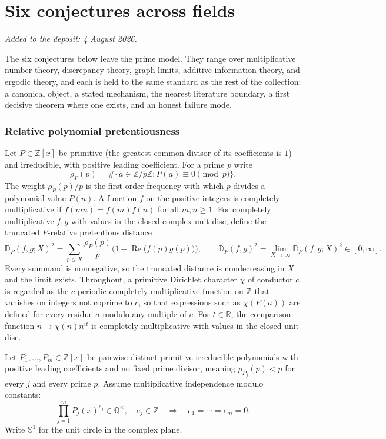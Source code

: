 \documentclass[11pt]{article}
\theoremstyle{definition}
\newcommand{\Z}{\mathbb Z}
\newcommand{\Q}{\mathbb Q}
\newcommand{\R}{\mathbb R}
\providecommand{\Z}{\mathbb Z}
\providecommand{\Q}{\mathbb Q}
\providecommand{\R}{\mathbb R}
\begin{document}
\part{Six conjectures across fields}

\medskip\noindent\emph{Added to the deposit: 4 August 2026.}\par\medskip

The six conjectures below leave the prime model.  They range over multiplicative number theory, discrepancy theory, graph limits, additive information theory, and ergodic theory, and each is held to the same standard as the rest of the collection: a canonical object, a stated mechanism, the nearest literature boundary, a first decisive theorem where one exists, and an honest failure mode.

\section{Relative polynomial pretentiousness}

Let $P\in\Z[x]$ be primitive (the greatest common divisor of its
coefficients is $1$) and irreducible, with positive leading
coefficient.  For a prime $p$ write
\[
\rho_P(p)=\#\{a\in\Z/p\Z:P(a)\equiv0\pmod p\}.
\]
The weight $\rho_P(p)/p$ is the first-order frequency with which $p$
divides a polynomial value $P(n)$.  A function $f$ on the positive
integers is completely multiplicative if $f(mn)=f(m)f(n)$ for all
$m,n\ge1$.  For completely multiplicative $f,g$ with values in the
closed complex unit disc, define the truncated $P$-relative pretentious
distance
\[
\mathbb D_P(f,g;X)^2
=
\sum_{p\le X}\frac{\rho_P(p)}{p}
\bigl(1-\operatorname{Re}\bigl(f(p)\overline{g(p)}\bigr)\bigr),
\qquad
\mathbb D_P(f,g)^2=\lim_{X\to\infty}\mathbb D_P(f,g;X)^2\in[0,\infty].
\]
Every summand is nonnegative, so the truncated distance is
nondecreasing in $X$ and the limit exists.  Throughout, a primitive
Dirichlet character $\chi$ of conductor $c$ is regarded as the
$c$-periodic completely multiplicative function on $\Z$ that vanishes
on integers not coprime to $c$, so that expressions such as
$\chi(P(a))$ are defined for every residue $a$ modulo any multiple of
$c$.  For $t\in\R$, the comparison function $n\mapsto\chi(n)n^{it}$ is
completely multiplicative with values in the closed unit disc.

Let $P_1,\ldots,P_m\in\Z[x]$ be pairwise distinct primitive
irreducible polynomials with positive leading coefficients and no
fixed prime divisor, meaning $\rho_{P_j}(p)<p$ for every $j$ and every
prime $p$.  Assume multiplicative independence modulo constants:
\[
\prod_{j=1}^m P_j(x)^{e_j}\in\Q^\times,\quad e_j\in\Z
\quad\Longrightarrow\quad
e_1=\cdots=e_m=0.
\]
Write $\mathbb S^1$ for the unit circle in the complex plane.
\end{document}
